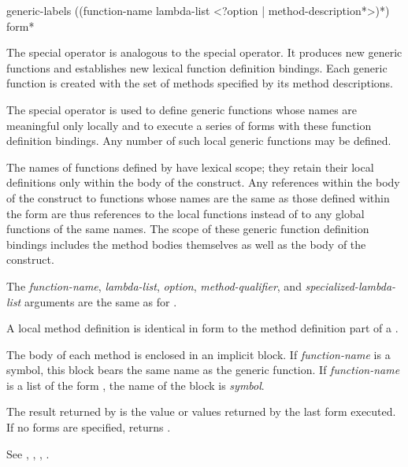 \begin{defspec}
generic-labels ({(function-name lambda-list
                <?option | {method-description}*>)}*)
               {form}*


The  special operator is analogous to the
 special operator.  It produces new generic functions and
establishes new lexical function definition bindings.  Each generic
function is created with the set of methods specified by its method
descriptions.



The special operator  is used to define generic functions
whose names are meaningful only locally and to execute a series of
forms with these function definition bindings.  Any number of
such  local generic functions may be defined.  



The names of functions defined by  have lexical
scope; they retain their local definitions only within the body of the
 construct.  Any references within the body of the
 construct to functions whose names are the same
as those defined within the  form are thus
references to the local functions instead of to any global functions
of the same names.  The scope of these generic function definition bindings
includes the method bodies themselves as well as the body of the 
 construct.




The \emph{function-name\/}, \emph{lambda-list\/}, \emph{option}, {\it
method-qualifier}, and \emph{specialized-lambda-list\/} arguments are
the same as for .

A  local method definition is identical in form to the
method definition part of a .

The body of each method is enclosed in an implicit block.  If {\it
function-name\/} is a symbol, this block bears the same name as
the generic function.  If \emph{function-name\/} is a list of the
form , the name of the block is {\it
symbol}.  


The result returned by  is the value or values
returned by the last form executed.  If no forms are specified, 
 returns .

See , , , .
\end{defspec}



